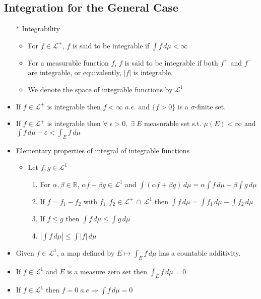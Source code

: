 \documentclass[12pt]{article}
\newcommand{\R}{\mathbb{R}}
\newcommand{\LL}{\mathcal{L}}
\newcommand{\exist}{\exists \;}
\newcommand{\intersect}{\,\cap\,}
\begin{document}
\subsection{Integration for the General Case}
\smallskip
\begin{itemize}
    \item[*] Integrability
    \begin{itemize}
        \item For $f\in \LL^+$, $f$ is said to be integrable if $\int f\, d\mu<\infty$
        \item For a measurable function $f$, $f$ is said to be integrable if both $f^+$ and $f^-$ are integrable, or equivalently, $|f|$ is integrable.
        \item We denote the space of integrable functions by $\LL^1$
    \end{itemize} 
    \item If $f\in \LL^+$ is integrable then $f<\infty \; a.e.$ and $\{f>0\}$ is a $\sigma$-finite set.
    \item If $f\in \LL^+$ is integrable then $\forall\; \epsilon>0, \; \exist E$ measurable set s.t. $\mu(E)<\infty$ and \\ $\int f\, d\mu -\varepsilon < \int_E f\, d\mu$
    \item Elementary properties of integral of integrable functions
    \begin{itemize}
        \item Let $f,g\in \LL^1$ 
        \begin{enumerate}
            \item For $\alpha, \beta\in \R$, \;$\alpha f+\beta g\in \LL^1$ and $\int (\alpha f+\beta g)\, d\mu=\alpha \int f \, d\mu+\beta \int g \, d\mu$
            \item If $f=f_1-f_2$ with $f_1, f_2\in \LL^+ \intersect \LL^1$ then $\int f\, d\mu=\int f_1\, d\mu- \int f_2\, d\mu$
            \item If $f\leq g$ then $\int f \, d\mu \leq \int g \, d\mu$ 
            \item $|\int f \, d\mu|\leq \int |f| \, d\mu$
        \end{enumerate}    
    \end{itemize}
    \item Given $f\in \LL^1$, a map defined by $E\mapsto \int_E f\, d\mu$ has a countable additivity.
    \item If $f\in \LL^1$ and $E$ is a measure zero set then $\int_E f\, d\mu=0$
    \item If $f\in \LL^1$ then $f=0 \; a.e \Rightarrow \int f \, d\mu=0$

\end{itemize}
\end{document}
